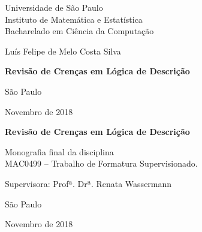 \documentclass[12pt, a4paper]{book}
\begin{document}
	
	\frontmatter 
	
	\fancyhead[RO]{{\footnotesize\rightmark}\hspace{2em}\thepage}
	\setcounter{tocdepth}{2}
	\fancyhead[LE]{\thepage\hspace{2em}\footnotesize{\leftmark}}
	\fancyhead[RE,LO]{}
	\fancyhead[RO]{{\footnotesize\rightmark}\hspace{2em}\thepage}
	
	\onehalfspacing  %
	
	\thispagestyle{empty}
	\begin{center}
		\vspace*{2.3cm}
		Universidade de São Paulo\\
		Instituto de Matemática e Estatística\\
		Bacharelado em Ciência da Computação
		
		
		\vspace*{3cm}
		\Large{Luís Felipe de Melo Costa Silva}
		
		
		\vspace{3cm}
		\textbf{Revisão de Crenças em Lógica de Descrição}
		
		
		\vskip 5cm
		\normalsize{São Paulo}
		
		\normalsize{Novembro de 2018}
	\end{center}
	
	\newpage
	\thispagestyle{empty}
	\begin{center}
		\vspace*{2.3 cm}
		\textbf{\Large{Revisão de Crenças em Lógica de Descrição}}
		\vspace*{2 cm}
	\end{center}
	
	\vskip 2cm
	
	\begin{flushright}
		Monografia final da disciplina \\
		MAC0499 -- Trabalho de Formatura Supervisionado.
	\end{flushright}
	
	\vskip 5cm
	
	\begin{center}
		Supervisora: Profª. Drª. Renata Wassermann
		
		\vskip 5cm
		\normalsize{São Paulo}
		
		\normalsize{Novembro de 2018}
	\end{center}
	\pagebreak
	
\end{document}

